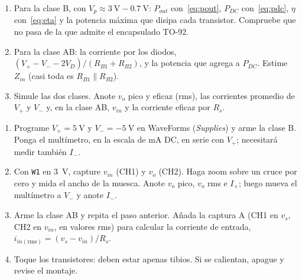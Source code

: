 \documentclass[11pt,a4paper]{article}
\newcommand{\pll}{\mathbin{\|}}
\begin{document}
\begin{enumerate}[label=\alph*), leftmargin=*, itemsep=3pt]
  \item Para la clase B, con $V_p \approx \qty{3}{\volt} - \qty{0.7}{\volt}$: $P_{out}$
        con~\eqref{eq:pout}, $P_{DC}$ con~\eqref{eq:pdc}, $\eta$ con~\eqref{eq:eta} y la
        potencia máxima que disipa cada transistor. Compruebe que no pasa de la que admite el
        encapsulado TO-92.
  \item Para la clase AB: la corriente por los diodos, $(V_+ - V_- - 2V_D)/(R_{B1} + R_{B2})$,
        y la potencia que agrega a $P_{DC}$. Estime $Z_{in}$ (casi toda es
        $R_{B1} \pll R_{B2}$).
  \item Simule las dos clases. Anote $v_o$ pico y eficaz (rms), las corrientes promedio de
        $V_+$ y $V_-$ y, en la clase AB, $v_{in}$ y la corriente eficaz por $R_s$.
\end{enumerate}

\begin{enumerate}[label=\alph*), ref=\alph*, leftmargin=*, itemsep=3pt]
  \item Programe $V_+ = \qty{5}{\volt}$ y $V_- = \qty{-5}{\volt}$ en WaveForms
        (\emph{Supplies}) y arme la clase B. Ponga el multímetro, en la escala de
        \unit{\milli\ampere} DC, en serie con $V_+$; necesitará medir también $I_-$.
  \item \label{paso:cruce}Con \texttt{W1} en \qty{3}{\volt}, capture $v_{in}$ (CH1) y $v_o$
        (CH2). Haga zoom sobre un cruce por cero y mida el ancho de la muesca. Anote
        $v_o$ pico, $v_o$ rms e $I_+$; luego mueva el multímetro a $V_-$ y anote $I_-$.
  \item Arme la clase AB y repita el paso anterior. Añada la captura A (CH1 en $v_s$, CH2 en
        $v_{in}$, en valores rms) para calcular la corriente de entrada,
        $i_{in(\text{rms})} = (v_{s} - v_{in})/R_s$.
  \item Toque los transistores: deben estar apenas tibios. Si se calientan, apague y revise
        el montaje.
\end{enumerate}
\end{document}
